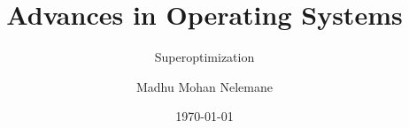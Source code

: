\author[Initials]{Madhu Mohan Nelemane}
\title{Advances in Operating Systems}
\subtitle{Superoptimization}
\date{\today}

\subject{subject}

\institute[OSE]{\chair\\ \chairsub}


\gittrue
\presentationtrue

